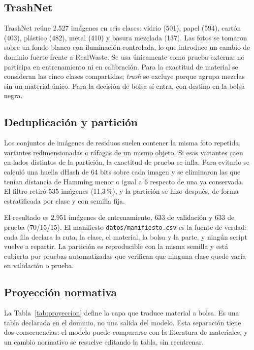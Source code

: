 \documentclass[10pt]{ieeeconf}
\begin{document}
\subsection{TrashNet}

TrashNet re\'une 2.527 im\'agenes en seis clases: vidrio (501), papel (594),
cart\'on (403), pl\'astico (482), metal (410) y basura mezclada (137). Las fotos
se tomaron sobre un fondo blanco con iluminaci\'on controlada, lo que introduce un
cambio de dominio fuerte frente a RealWaste. Se usa \'unicamente como prueba
externa: no participa en entrenamiento ni en calibraci\'on. Para la exactitud de
material se consideran las cinco clases compartidas; \textit{trash} se excluye
porque agrupa mezclas sin un material \'unico. Para la decisi\'on de bolsa s\'i
entra, con destino en la bolsa negra.

\subsection{Deduplicaci\'on y partici\'on}

Los conjuntos de im\'agenes de residuos suelen contener la misma foto repetida,
variantes redimensionadas o r\'afagas de un mismo objeto. Si esas variantes caen
en lados distintos de la partici\'on, la exactitud de prueba se infla. Para
evitarlo se calcul\'o una huella dHash de 64 bits sobre cada imagen y se
eliminaron las que ten\'ian distancia de Hamming menor o igual a 6 respecto de
una ya conservada. El filtro retir\'o 535 im\'agenes (11,3\,\%), y la partici\'on
se hizo despu\'es, de forma estratificada por clase y con semilla fija.

El resultado es 2.951 im\'agenes de entrenamiento, 633 de validaci\'on y 633 de
prueba (70/15/15). El manifiesto \texttt{datos/manifiesto.csv} es la fuente de
verdad: cada fila declara la ruta, la clase, el material, la bolsa y la parte, y
ning\'un script vuelve a repartir. La partici\'on es reproducible con la misma
semilla y est\'a cubierta por pruebas automatizadas que verifican que ninguna
clase quede vac\'ia en validaci\'on o prueba.

\subsection{Proyecci\'on normativa}

La Tabla~\ref{tab:proyeccion} define la capa que traduce material a bolsa. Es una
tabla declarada en el dominio, no una salida del modelo. Esta separaci\'on tiene
dos consecuencias: el modelo puede compararse con la literatura de materiales, y
un cambio normativo se resuelve editando la tabla, sin reentrenar.
\end{document}
